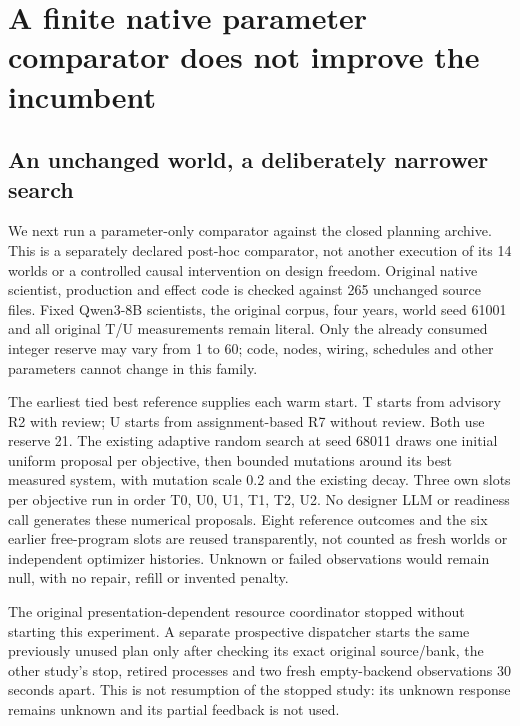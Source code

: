 \section{A finite native parameter comparator does not improve the incumbent}
\label{sec:native-numeric-comparator}
\subsection{An unchanged world, a deliberately narrower search}
We next run a parameter-only comparator against the closed planning archive.
This is a separately declared post-hoc comparator, not another execution of
its 14 worlds or a controlled causal intervention on design freedom.
Original native scientist, production and effect code is checked against
265 unchanged source files. Fixed Qwen3-8B scientists, the original corpus,
four years, world seed 61001 and all original T/U measurements remain literal.
Only the already consumed integer reserve may vary from 1 to 60; code, nodes,
wiring, schedules and other parameters cannot change in this family.

The earliest tied best reference supplies each warm start. T starts from
advisory R2 with review; U starts from assignment-based R7 without review.
Both use reserve 21. The existing adaptive random search at seed 68011
draws one initial uniform proposal per
objective, then bounded mutations around its best measured system, with
mutation scale 0.2 and the existing decay. Three own slots per objective run
in order T0, U0, U1, T1, T2, U2. No designer LLM or readiness call generates these
numerical proposals. Eight reference outcomes and the six earlier free-program
slots are reused transparently, not counted as fresh worlds or independent
optimizer histories. Unknown or failed observations would remain null, with
no repair, refill or invented penalty.

The original presentation-dependent resource coordinator stopped without
starting this experiment. A separate prospective dispatcher starts the same
previously unused plan only after checking its exact original source/bank,
the other study's stop, retired processes and two fresh empty-backend
observations 30 seconds apart. This is not resumption of the stopped study:
its unknown response remains unknown and its partial feedback is not used.

